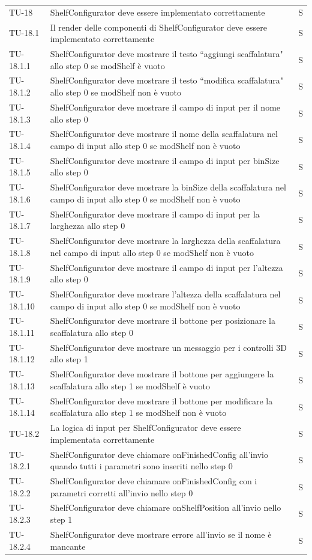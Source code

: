 \begin{xltabular}{0.9\textwidth}{X | p{0.6\textwidth} | p{0.1\textwidth} }
    TU-18 & ShelfConfigurator deve essere implementato correttamente & S\\
    TU-18.1 & Il render delle componenti di ShelfConfigurator deve essere implementato correttamente & S\\
    TU-18.1.1 & ShelfConfigurator deve mostrare il testo ``aggiungi scaffalatura" allo step 0 se modShelf è vuoto & S\\
    TU-18.1.2 & ShelfConfigurator deve mostrare il testo ``modifica scaffalatura" allo step 0 se modShelf non è vuoto & S\\
    TU-18.1.3 & ShelfConfigurator deve mostrare il campo di input per il nome allo step 0 & S\\
    TU-18.1.4 & ShelfConfigurator deve mostrare il nome della scaffalatura nel campo di input allo step 0 se modShelf non è vuoto & S\\
    TU-18.1.5 & ShelfConfigurator deve mostrare il campo di input per binSize allo step 0 & S\\
    TU-18.1.6 & ShelfConfigurator deve mostrare la binSize della scaffalatura nel campo di input allo step 0 se modShelf non è vuoto & S\\
    TU-18.1.7 & ShelfConfigurator deve mostrare il campo di input per la larghezza allo step 0 & S\\
    TU-18.1.8 & ShelfConfigurator deve mostrare la larghezza della scaffalatura nel campo di input allo step 0 se modShelf non è vuoto & S\\
    TU-18.1.9 & ShelfConfigurator deve mostrare il campo di input per l'altezza allo step 0 & S\\
    TU-18.1.10 & ShelfConfigurator deve mostrare l'altezza della scaffalatura nel campo di input allo step 0 se modShelf non è vuoto & S\\
    TU-18.1.11 & ShelfConfigurator deve mostrare il bottone per posizionare la scaffalatura allo step 0 & S\\
    TU-18.1.12 & ShelfConfigurator deve mostrare un messaggio per i controlli 3D allo step 1 & S\\
    TU-18.1.13 & ShelfConfigurator deve mostrare il bottone per aggiungere la scaffalatura allo step 1 se modShelf è vuoto & S\\
    TU-18.1.14 & ShelfConfigurator deve mostrare il bottone per modificare la scaffalatura allo step 1 se modShelf non è vuoto & S\\
    TU-18.2 & La logica di input per ShelfConfigurator deve essere implementata correttamente & S\\
    TU-18.2.1 & ShelfConfigurator deve chiamare onFinishedConfig all'invio quando tutti i parametri sono inseriti nello step 0 & S\\
    TU-18.2.2 & ShelfConfigurator deve chiamare onFinishedConfig con i parametri corretti all'invio nello step 0 & S\\
    TU-18.2.3 & ShelfConfigurator deve chiamare onShelfPosition all'invio nello step 1 & S\\
    TU-18.2.4 & ShelfConfigurator deve mostrare errore all'invio se il nome è mancante & S\\


\end{xltabular}
